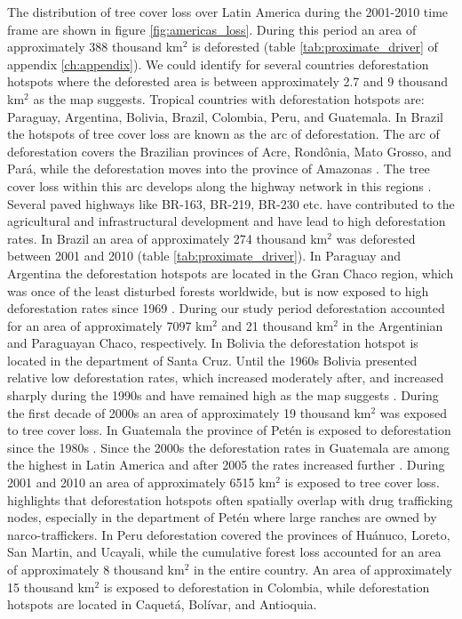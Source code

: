 			The distribution of tree cover loss over Latin America during the 2001-2010 time frame are shown in figure \ref{fig:americas_loss}. During this period an area of approximately 388 thousand km$^2$ is deforested (table \ref{tab:proximate_driver} of appendix \ref{ch:appendix}). We could identify for several countries deforestation hotspots where the deforested area is between approximately 2.7 and 9 thousand km$^2$ as the map suggests. Tropical countries with deforestation hotspots are: Paraguay, Argentina, Bolivia, Brazil, Colombia, Peru, and Guatemala. In Brazil the hotspots of tree cover loss are known as the arc of deforestation. The arc of deforestation covers the Brazilian provinces of Acre, Rond\^{o}nia, Mato Grosso, and Pará, while the deforestation moves into the province of Amazonas \citep{Wood2002}. The tree cover loss within this arc develops along the highway network in this regions \citep{Alves2002,Mueller2016}. Several paved highways like BR-163, BR-219, BR-230 etc. have contributed to the agricultural and infrastructural development and have lead to high deforestation rates. In Brazil an area of approximately 274 thousand km$^2$ was deforested between 2001 and 2010 (table \ref{tab:proximate_driver}). In Paraguay and Argentina the deforestation hotspots are located in the Gran Chaco region, which was once of the least disturbed forests worldwide, but is now exposed to high deforestation rates since 1969 \citep{Caldas2013,Zak2004}. During our study period deforestation accounted for an area of approximately 7097 km$^2$ and 21 thousand km$^2$ in the Argentinian and Paraguayan Chaco, respectively. In Bolivia the deforestation hotspot is located in the department of Santa Cruz. Until the 1960s Bolivia presented relative low deforestation rates, which increased moderately after, and increased sharply during the 1990s and have remained high as the map suggests \citep{Pacheco2002,DavidKaimowitz2002}. During the first decade of 2000s an area of approximately 19 thousand km$^2$ was exposed to tree cover loss. In Guatemala the province of Petén is exposed to deforestation since the 1980s \citep{Beach1998}. Since the 2000s the deforestation rates in Guatemala are among the highest in Latin America and after 2005 the rates increased further \citep{McSweeney2014}. During 2001 and 2010 an area of approximately 6515 km$^2$ is exposed to tree cover loss. \citet{McSweeney2014} highlights that deforestation hotspots often spatially overlap with drug trafficking nodes, especially in the department of Petén where large ranches are owned by narco-traffickers. In Peru deforestation covered the provinces of Huánuco, Loreto, San Martin, and Ucayali, while the cumulative forest loss accounted for an area of approximately 8 thousand km$^2$ in the entire country. An area of approximately 15 thousand km$^2$ is exposed to deforestation in Colombia, while deforestation hotspots are located in Caquetá, Bolívar, and Antioquia.
